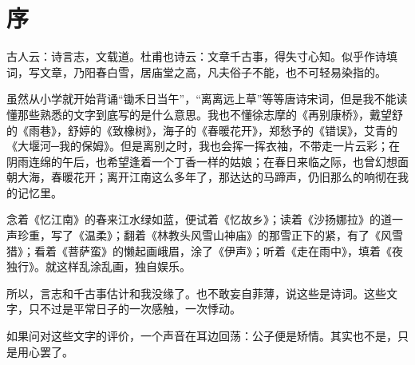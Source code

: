 \chapter{序}

古人云：诗言志，文载道。杜甫也诗云：文章千古事，得失寸心知。似乎作诗填词，写文章，乃阳春白雪，居庙堂之高，凡夫俗子不能，也不可轻易染指的。

虽然从小学就开始背诵“锄禾日当午”，“离离远上草”等等唐诗宋词，但是我不能读懂那些熟悉的文字到底写的是什么意思。我也不懂徐志摩的《再别康桥》，戴望舒的《雨巷》，舒婷的《致橡树》，海子的《春暖花开》，郑愁予的《错误》，艾青的《大堰河─我的保姆》。但是离别之时，我也会挥一挥衣袖，不带走一片云彩；在阴雨连绵的午后，也希望逢着一个丁香一样的姑娘；在春日来临之际，也曾幻想面朝大海，春暖花开；离开江南这么多年了，那达达的马蹄声，仍旧那么的响彻在我的记忆里。

念着《忆江南》的春来江水绿如蓝，便试着《忆故乡》；读着《沙扬娜拉》的道一声珍重，写了《温柔》；翻着《林教头风雪山神庙》的那雪正下的紧，有了《风雪猎》；看着《菩萨蛮》的懒起画峨眉，涂了《伊声》；听着《走在雨中》，填着《夜独行》。就这样乱涂乱画，独自娱乐。

所以，言志和千古事估计和我没缘了。也不敢妄自菲薄，说这些是诗词。这些文字，只不过是平常日子的一次感触，一次悸动。

如果问对这些文字的评价，一个声音在耳边回荡：公子便是矫情。其实也不是，只是用心罢了。

